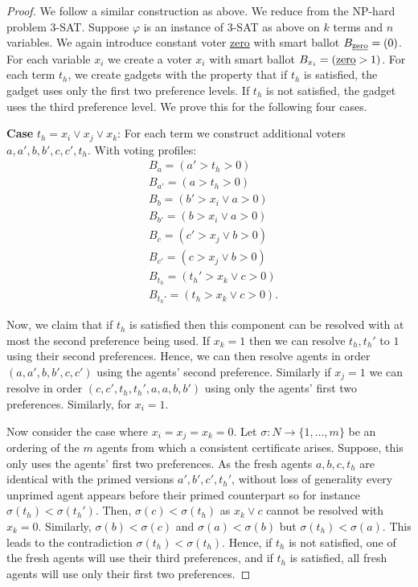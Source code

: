 \documentclass[11pt,a4paper, titlepage]{article}
\theoremstyle{definition}
\begin{document}
\begin{proof}
    We follow a similar construction as above. We reduce from the NP-hard problem \textsc{3-SAT}. Suppose $\varphi$ is an instance of \textsc{3-SAT} as above on $k$ terms and $n$ variables. We again introduce constant voter \underline{zero} with smart ballot $B_{\text{\underline{zero}}} = (0)$. For each variable $x_i$ we create a voter $x_i$ with smart ballot $B_{x_i} = (\text{\underline{zero}} > 1)$. For each term $t_h$, we create gadgets with the property that if $t_h$ is satisfied, the gadget uses only the first two preference levels. If $t_h$ is not satisfied, the gadget uses the third preference level. We prove this for the following four cases.

    \textbf{Case} $t_h = x_i \lor x_j \lor x_k$:
    For each term we construct additional voters $a, a', b, b', c, c', t_h$. With voting profiles: 
    \begin{align*}
        &B_a = (a' > t_h > 0) \\
        &B_{a'} = (a > t_h > 0) \\
        &B_{b} = (b' > x_i \lor a > 0) \\
        &B_{b'} = (b > x_i \lor a > 0) \\
        &B_{c} = (c' > x_j \lor b > 0) \\
        &B_{c'} = (c > x_j \lor b > 0) \\
        &B_{t_h} = (t_h' > x_k \lor c > 0) \\
        &B_{t_h'} = (t_h > x_k \lor c > 0).
    \end{align*}

    Now, we claim that if $t_h$ is satisfied then this component can be resolved with at most the second preference being used. 
    If $x_k = 1$ then we can resolve $t_h, t_h'$ to $1$ using their second preferences. 
    Hence, we can then resolve agents in order $(a, a', b, b', c, c')$ using the agents' second preference. 
    Similarly if $x_j = 1$ we can resolve in order $(c, c', t_h, t_h', a, a, b, b')$ using only the agents' first two preferences. Similarly, for $x_i = 1$.

    Now consider the case where $x_i = x_j = x_k = 0$. Let $\sigma \colon N \longrightarrow \{1, \ldots, m\}$ be an ordering of the $m$ agents from which a consistent certificate arises. Suppose, this only uses the agents' first two preferences.
    As the fresh agents $a, b, c, t_h$ are identical with the primed versions $a', b', c', t_h'$, without loss of generality every unprimed agent appears before their primed counterpart so for instance $\sigma(t_h) < \sigma(t_h')$. 
    Then, $\sigma(c) < \sigma(t_h)$ as $x_k \lor c$ cannot be resolved with $x_k = 0$. 
    Similarly, $\sigma(b) < \sigma(c)$ and $ \sigma(a) < \sigma(b)$ but $\sigma(t_h) < \sigma(a)$. This leads to the contradiction $\sigma(t_h) < \sigma(t_h)$. 
    Hence, if $t_h$ is not satisfied, one of the fresh agents will use their third preferences, and if $t_h$ is satisfied, all fresh agents will use only their first two preferences.


\end{proof}
\end{document}
